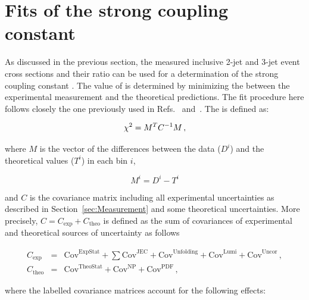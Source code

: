 \chapter{Fits of the strong coupling constant}
\label{sec:Fits}

As discussed in the previous section, the measured inclusive 2-jet and 3-jet event cross sections and their ratio \ratio can be used for a determination of the strong coupling constant \alpsmz. The value of \alpsmz is determined by minimizing the \chisq between the experimental measurement and the theoretical predictions. The fit procedure here follows closely the one previously used in Refs.~\cite{Chatrchyan:2013txa} and~\cite{Khachatryan:2014waa}. The \chisq is defined as:

\begin{equation}
  \label{chisq}
  \chi^2 = M^{T}C^{-1}M\,,
\end{equation}

where $M$ is the vector of the differences between the data ($D^{i}$) and the theoretical values ($T^{i}$) in each bin $i$,

\begin{equation}
  \label{eqn:M_matrix}
  M^{i}=D^{i}-T^{i}
\end{equation}

and $C$ is the covariance matrix including all experimental uncertainties as described in Section~\ref{sec:Measurement} and some theoretical uncertainties. More precisely, $C=C_\mathrm{exp}+C_\mathrm{theo}$ is defined as the sum of covariances of experimental and theoretical sources of uncertainty as follows

\begin{eqnarray}
  \label{eqn:c_exp}
  C_\mathrm{exp} &=& \mathrm{Cov}^\mathrm{ExpStat} + \sum\mathrm{Cov}^\mathrm{JEC} +
  \mathrm{Cov}^\mathrm{Unfolding} +
  \mathrm{Cov}^\mathrm{Lumi} +
  \mathrm{Cov}^\mathrm{Uncor}\,,\\
  C_\mathrm{theo} &=& \mathrm{Cov}^\mathrm{TheoStat} + \mathrm{Cov}^\mathrm{NP} + \mathrm{Cov}^\mathrm{PDF}\,,
  \label{eqn:c_theo}
\end{eqnarray}

where the labelled covariance matrices account for the following effects:

